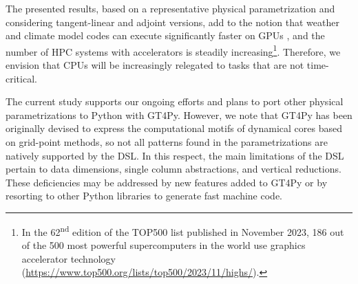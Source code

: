 \documentclass[gmd,manuscript,online]{copernicus}
\theoremstyle{theorem}
\theoremstyle{definition}
\theoremstyle{remark}
\theoremstyle{proposition}
\begin{document}
	The presented results, based on a representative physical parametrization and considering tangent-linear and adjoint versions, add to the notion that weather and climate model codes can execute significantly faster on GPUs \citep{fuhrer18}, and the number of HPC systems with accelerators is steadily increasing\footnote{In the 62\textsuperscript{nd} edition of the TOP500 list published in November 2023, 186 out of the 500 most powerful supercomputers in the world use graphics accelerator technology (\url{https://www.top500.org/lists/top500/2023/11/highs/}).}. Therefore, we envision that CPUs will be increasingly relegated to tasks that are not time-critical.


	The current study supports our ongoing efforts and plans to port other physical parametrizations to Python with GT4Py. However, we note that GT4Py has been originally devised to express the computational motifs of dynamical cores based on grid-point methods, so not all patterns found in the parametrizations are natively supported by the DSL. In this respect, the main limitations of the DSL pertain to data dimensions, single column abstractions, and vertical reductions. These deficiencies may be addressed by new features added to GT4Py or by resorting to other Python libraries to generate fast machine code.

\end{document}
